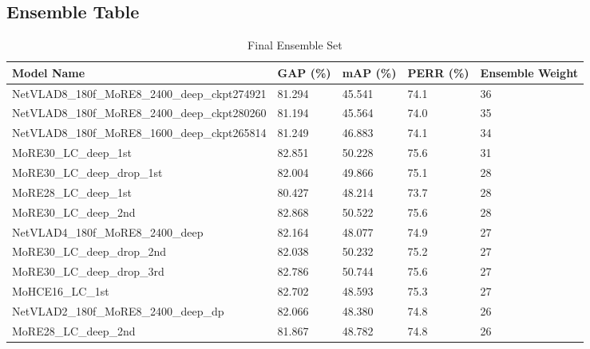 \documentclass[10pt,twocolumn,letterpaper]{article}
\begin{document}
{\small


}





\begin{appendices}



\section{Ensemble Table}



\begin{table*}[t]
\centering
\caption{Final Ensemble Set}
\label{table:ensemble}
\begin{tabular}{lP{1.5cm}P{1.5cm}P{1.5cm}P{2.5cm}}
Model Name                             & GAP (\%)   & mAP (\%) & PERR (\%) & Ensemble Weight \\ \hline \hline
NetVLAD8\_180f\_MoRE8\_2400\_deep\_ckpt274921   &  81.294  &  45.541  &  74.1  &  36  \\
NetVLAD8\_180f\_MoRE8\_2400\_deep\_ckpt280260   &  81.194  &  45.564  &  74.0  &  35 \\  
NetVLAD8\_180f\_MoRE8\_1600\_deep\_ckpt265814   &  81.249  &  46.883  &  74.1  &  34 \\
MoRE30\_LC\_deep\_1st                            &  82.851  &  50.228  &  75.6  &  31 \\
MoRE30\_LC\_deep\_drop\_1st                      &  82.004  &  49.866  &  75.1  &  28 \\
MoRE28\_LC\_deep\_1st                            &  80.427  &  48.214  &  73.7  &  28 \\
MoRE30\_LC\_deep\_2nd                            &  82.868  &  50.522  &  75.6  &  28 \\
NetVLAD4\_180f\_MoRE8\_2400\_deep               &  82.164  &  48.077  &  74.9  &  27 \\
MoRE30\_LC\_deep\_drop\_2nd                      &  82.038  &  50.232  &  75.2  &  27 \\
MoRE30\_LC\_deep\_drop\_3rd                      &  82.786  &  50.744  &  75.6  &  27 \\
MoHCE16\_LC\_1st                                 &  82.702  &  48.593  &  75.3  &  27 \\
NetVLAD2\_180f\_MoRE8\_2400\_deep\_dp           &  82.066  &  48.380  &  74.8  &  26 \\
MoRE28\_LC\_deep\_2nd                            &  81.867  &  48.782  &  74.8  &  26 \\

\end{tabular}
\end{table*}
\end{appendices}
\end{document}
